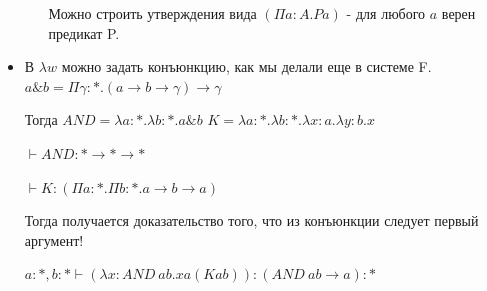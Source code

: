 \begin{itemize}
\begin{enumerate}
	    Можно строить утверждения вида $(\Pi a : A. P a)$ - для любого $a$ верен предикат P.
	    
	\end{enumerate}
	
    \item В $\lambda w$ можно задать конъюнкцию, как мы делали еще в системе F. $a \& b = \Pi \gamma : * . (a \rightarrow b \rightarrow \gamma) \rightarrow \gamma$
    
    Тогда $AND = \lambda a : *. \lambda b : *. a \& b$
    $K = \lambda a : *. \lambda b : *. \lambda x : a . \lambda y : b. x$
    
    $\vdash AND : * \rightarrow * \rightarrow *$
    
    $\vdash K : (\Pi a : *. \Pi b : *. a \rightarrow b \rightarrow a)$
    
    Тогда получается доказательство того, что из конъюнкции следует первый аргумент!
    
    $a : *, b : * \vdash (\lambda x : AND \: a b. x a (K a b)) : (AND \: a b \rightarrow a) : *$

\end{itemize}

